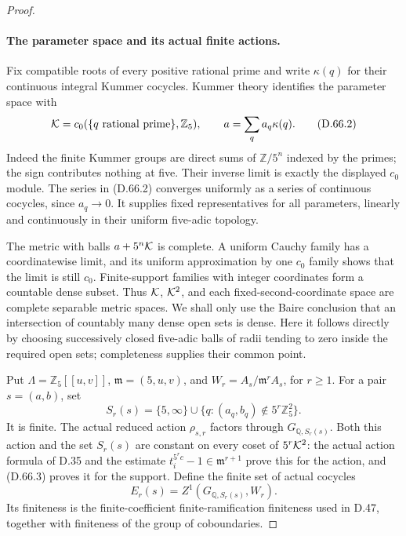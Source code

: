\begin{proof}
\paragraph{The parameter space and its actual finite actions.}
Fix compatible roots of every positive rational prime and
write \(\kappa(q)\) for their continuous integral Kummer
cocycles. Kummer theory identifies the parameter space with
\[
 {\cal K}=c_0(\{q\text{ rational prime}\},\mathbb Z_5),
 \qquad a=\sum_q a_q\kappa(q).                         \tag{D.66.2}
\]
Indeed the finite Kummer groups are direct sums of
\(\mathbb Z/5^n\) indexed by the primes; the sign contributes
nothing at five. Their inverse limit is exactly the displayed
\(c_0\) module. The series in (D.66.2) converges uniformly as
a series of continuous cocycles, since \(a_q\to0\).
It supplies fixed representatives for all parameters,
linearly and continuously in their uniform five-adic topology.

The metric with balls \(a+5^n{\cal K}\) is complete.
A uniform Cauchy family has a coordinatewise limit, and its
uniform approximation by one \(c_0\) family shows that the
limit is still \(c_0\). Finite-support families with integer
coordinates form a countable dense subset. Thus \({\cal K}\),
\({\cal K}^2\), and each fixed-second-coordinate space are
complete separable metric spaces. We shall only use the
Baire conclusion that an intersection of countably many
dense open sets is dense. Here it follows directly by
choosing successively closed five-adic balls of radii tending
to zero inside the required open sets; completeness supplies
their common point.

Put \(\Lambda=\mathbb Z_5[[u,v]]\),
\(\mathfrak m=(5,u,v)\), and
\(W_r=A_s/\mathfrak m^rA_s\), for \(r\ge1\). For a
pair \(s=(a,b)\), set
\[
 S_r(s)=\{5,\infty\}\cup
       \{q:(a_q,b_q)\notin5^r\mathbb Z_5^2\}.          \tag{D.66.3}
\]
It is finite. The actual reduced action \(\rho_{s,r}\)
factors through \(G_{\mathbb Q,S_r(s)}\). Both this
action and the set \(S_r(s)\) are constant on every
coset of \(5^r{\cal K}^2\): the actual action formula
of D.35 and the estimate
\(t_i^{5^r c}-1\in\mathfrak m^{r+1}\) prove this
for the action, and (D.66.3) proves it for the support.
Define the finite set of actual cocycles
\[
 E_r(s)=Z^1(G_{\mathbb Q,S_r(s)},W_r).                  \tag{D.66.4}
\]
Its finiteness is the finite-coefficient finite-ramification
finiteness used in D.47, together with finiteness of the
group of coboundaries.


\end{proof}
